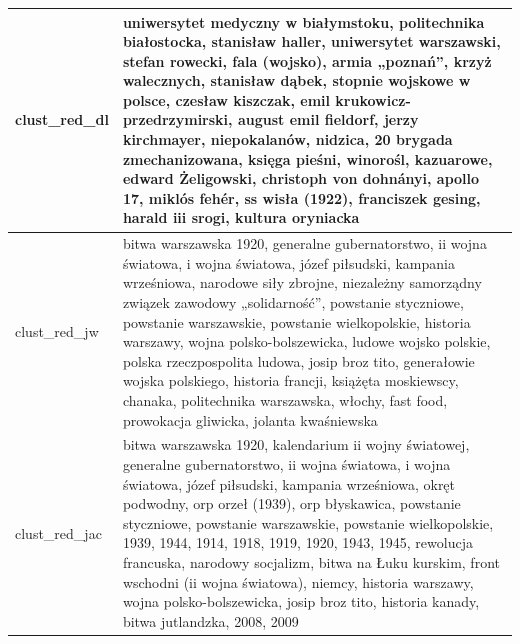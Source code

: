 \documentclass{praca1}
\begin{document}
\begin{longtable}{|L{0.5cm}|L{15cm}|}
   \hline
\begin{sideways}clust\_red\_dl\end{sideways} & uniwersytet medyczny w białymstoku, politechnika białostocka, stanisław haller, uniwersytet warszawski, stefan rowecki, fala (wojsko), armia „poznań”, krzyż walecznych, stanisław dąbek, stopnie wojskowe w polsce, czesław kiszczak, emil krukowicz-przedrzymirski, august emil fieldorf, jerzy kirchmayer, niepokalanów, nidzica, 20 brygada zmechanizowana, księga pieśni, winorośl, kazuarowe, edward Żeligowski, christoph von dohnányi, apollo 17, miklós fehér, ss wisła (1922), franciszek gesing, harald iii srogi, kultura oryniacka \\ %
   \hline
\begin{sideways}clust\_red\_jw\end{sideways} & bitwa warszawska 1920, generalne gubernatorstwo, ii wojna światowa, i wojna światowa, józef piłsudski, kampania wrześniowa, narodowe siły zbrojne, niezależny samorządny związek zawodowy „solidarność”, powstanie styczniowe, powstanie warszawskie, powstanie wielkopolskie, historia warszawy, wojna polsko-bolszewicka, ludowe wojsko polskie, polska rzeczpospolita ludowa, josip broz tito, generałowie wojska polskiego, historia francji, książęta moskiewscy, chanaka, politechnika warszawska, włochy, fast food, prowokacja gliwicka, jolanta kwaśniewska \\ %
   \hline
\begin{sideways}clust\_red\_jac\end{sideways} & bitwa warszawska 1920, kalendarium ii wojny światowej, generalne gubernatorstwo, ii wojna światowa, i wojna światowa, józef piłsudski, kampania wrześniowa, okręt podwodny, orp orzeł (1939), orp błyskawica, powstanie styczniowe, powstanie warszawskie, powstanie wielkopolskie, 1939, 1944, 1914, 1918, 1919, 1920, 1943, 1945, rewolucja francuska, narodowy socjalizm, bitwa na Łuku kurskim, front wschodni (ii wojna światowa), niemcy, historia warszawy, wojna polsko-bolszewicka, josip broz tito, historia kanady, bitwa jutlandzka, 2008, 2009 \\ %

\end{longtable}
\end{document}
